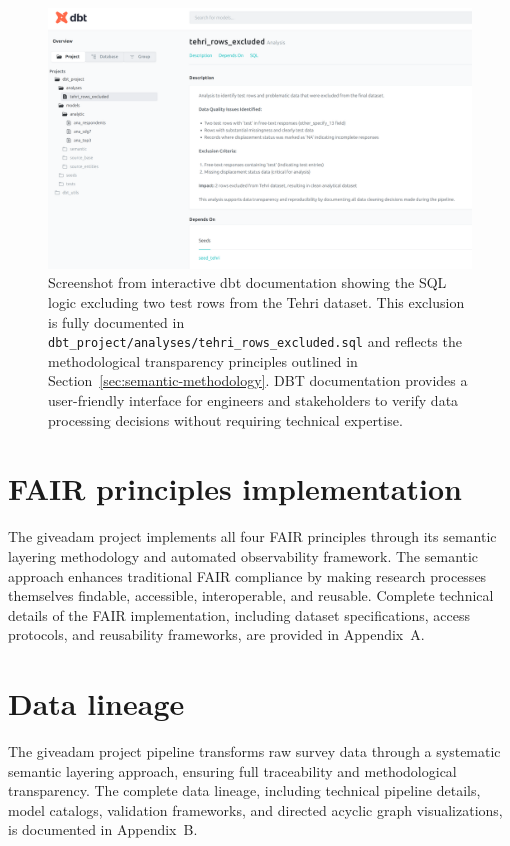 \documentclass{article}
\begin{document}
\begin{figure}[ht]
  \centering
  \includegraphics[width=\textwidth]{img/dbt-docs-tehri-exclusions.png}
  \caption[DBT documentation]{\label{fig:tehri-exclusions} Screenshot from interactive dbt documentation showing the SQL logic excluding two test rows from the Tehri dataset. This exclusion is fully documented in \texttt{dbt\_project/analyses/tehri\_rows\_excluded.sql} and reflects the methodological transparency principles outlined in Section~\ref{sec:semantic-methodology}. DBT documentation provides a user-friendly interface for engineers and stakeholders to verify data processing decisions without requiring technical expertise.}
\end{figure}

\section{FAIR principles implementation}
\label{sec:fair}

The giveadam project implements all four FAIR principles through its semantic layering methodology and automated observability framework. The semantic approach enhances traditional FAIR compliance by making research processes themselves findable, accessible, interoperable, and reusable. Complete technical details of the FAIR implementation, including dataset specifications, access protocols, and reusability frameworks, are provided in Appendix~A.

\section{Data lineage}
\label{sec:data-lineage}

The giveadam project pipeline transforms raw survey data through a systematic semantic layering approach, ensuring full traceability and methodological transparency. The complete data lineage, including technical pipeline details, model catalogs, validation frameworks, and directed acyclic graph visualizations, is documented in Appendix~B.
\end{document}
